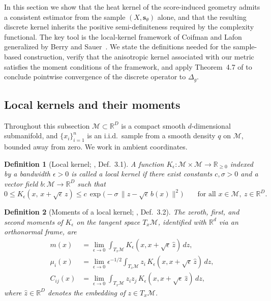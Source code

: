 \documentclass{article}
\newcommand{\M}{\mathcal{M}}
\newtheorem{definition}{Definition}
\begin{document}
In this section we show that the heat kernel of the score-induced geometry admits a consistent estimator from the sample \((X,\mathbf{s}_\theta)\) alone, and that the resulting discrete kernel inherits the positive semi-definiteness required by the complexity functional. The key tool is the local-kernel framework of Coifman and Lafon~\citep{coifman2006diffusion} generalized by Berry and Sauer~\citep{berry2016local}. We state the definitions needed for the sample-based construction, verify that the anisotropic kernel associated with our metric satisfies the moment conditions of the framework, and apply Theorem~4.7 of \citep{berry2016local} to conclude pointwise convergence of the discrete operator to \(\Delta_g\).

\subsection{Local kernels and their moments}

Throughout this subsection \(\M\subset\mathbb{R}^D\) is a compact smooth \(d\)-dimensional submanifold, and \(\{x_i\}_{i=1}^{n}\) is an i.i.d.\ sample from a smooth density \(q\) on \(\M\), bounded away from zero. We work in ambient coordinates.

\begin{definition}[Local kernel; \citep{berry2016local}, Def.~3.1]\label{def:local-kernel}
A function \(K_\epsilon:\M\times\M\to\mathbb{R}_{\geq 0}\) indexed by a bandwidth \(\epsilon>0\) is called a \emph{local kernel} if there exist constants \(c,\sigma>0\) and a vector field \(b:\M\to\mathbb{R}^D\) such that
\[
0\leq K_\epsilon(x,\,x+\sqrt{\epsilon}\,z)\leq c\,\exp\!\bigl(-\sigma\,\|z-\sqrt{\epsilon}\,b(x)\|^2\bigr)
\qquad
\text{for all }x\in\M,\ z\in\mathbb{R}^D.
\]
\end{definition}

\begin{definition}[Moments of a local kernel; \citep{berry2016local}, Def.~3.2]\label{def:moments}
The zeroth, first, and second moments of \(K_\epsilon\) on the tangent space \(T_x\M\), identified with \(\mathbb{R}^d\) via an orthonormal frame, are
\begin{align*}
m(x) &= \lim_{\epsilon\to 0}\int_{T_x\M}K_\epsilon(x,x+\sqrt\epsilon\,\hat z)\,dz,\\
\mu_i(x) &= \lim_{\epsilon\to 0}\epsilon^{-1/2}\int_{T_x\M}z_i\,K_\epsilon(x,x+\sqrt\epsilon\,\hat z)\,dz,\\
C_{ij}(x) &= \lim_{\epsilon\to 0}\int_{T_x\M}z_iz_j\,K_\epsilon(x,x+\sqrt\epsilon\,\hat z)\,dz,
\end{align*}
where \(\hat z\in\mathbb{R}^D\) denotes the embedding of \(z\in T_x\M\).
\end{definition}
\end{document}
